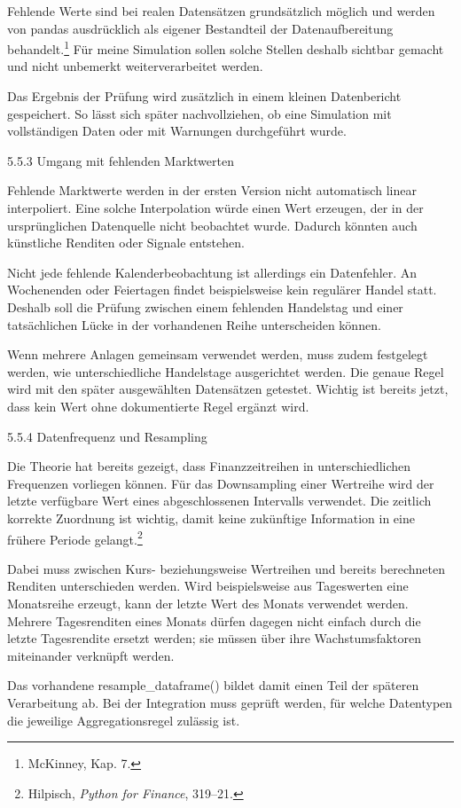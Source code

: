 \documentclass[
  ngerman,
  a4paper,
  DIV=11,
  oneside]{scrreprt}
\begin{document}
Fehlende Werte sind bei realen Datensätzen grundsätzlich möglich und
werden von pandas ausdrücklich als eigener Bestandteil der
Datenaufbereitung behandelt.\footnote{McKinney, Kap. 7.} Für meine
Simulation sollen solche Stellen deshalb sichtbar gemacht und nicht
unbemerkt weiterverarbeitet werden.

Das Ergebnis der Prüfung wird zusätzlich in einem kleinen Datenbericht
gespeichert. So lässt sich später nachvollziehen, ob eine Simulation mit
vollständigen Daten oder mit Warnungen durchgeführt wurde.

5.5.3 Umgang mit fehlenden Marktwerten

Fehlende Marktwerte werden in der ersten Version nicht automatisch
linear interpoliert. Eine solche Interpolation würde einen Wert
erzeugen, der in der ursprünglichen Datenquelle nicht beobachtet wurde.
Dadurch könnten auch künstliche Renditen oder Signale entstehen.

Nicht jede fehlende Kalenderbeobachtung ist allerdings ein Datenfehler.
An Wochenenden oder Feiertagen findet beispielsweise kein regulärer
Handel statt. Deshalb soll die Prüfung zwischen einem fehlenden
Handelstag und einer tatsächlichen Lücke in der vorhandenen Reihe
unterscheiden können.

Wenn mehrere Anlagen gemeinsam verwendet werden, muss zudem festgelegt
werden, wie unterschiedliche Handelstage ausgerichtet werden. Die genaue
Regel wird mit den später ausgewählten Datensätzen getestet. Wichtig ist
bereits jetzt, dass kein Wert ohne dokumentierte Regel ergänzt wird.

5.5.4 Datenfrequenz und Resampling

Die Theorie hat bereits gezeigt, dass Finanzzeitreihen in
unterschiedlichen Frequenzen vorliegen können. Für das Downsampling
einer Wertreihe wird der letzte verfügbare Wert eines abgeschlossenen
Intervalls verwendet. Die zeitlich korrekte Zuordnung ist wichtig, damit
keine zukünftige Information in eine frühere Periode gelangt.\footnote{Hilpisch,
  \emph{Python for Finance}, 319--21.}

Dabei muss zwischen Kurs- beziehungsweise Wertreihen und bereits
berechneten Renditen unterschieden werden. Wird beispielsweise aus
Tageswerten eine Monatsreihe erzeugt, kann der letzte Wert des Monats
verwendet werden. Mehrere Tagesrenditen eines Monats dürfen dagegen
nicht einfach durch die letzte Tagesrendite ersetzt werden; sie müssen
über ihre Wachstumsfaktoren miteinander verknüpft werden.

Das vorhandene resample\_dataframe() bildet damit einen Teil der
späteren Verarbeitung ab. Bei der Integration muss geprüft werden, für
welche Datentypen die jeweilige Aggregationsregel zulässig ist.
\end{document}
